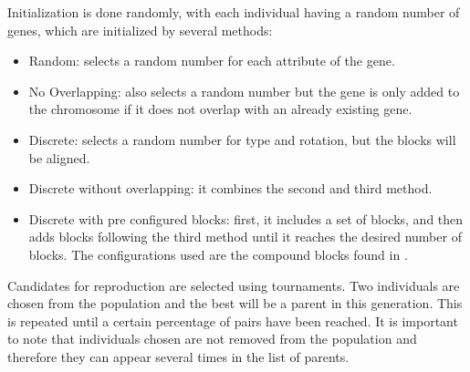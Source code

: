 \documentclass[runningheads,a4paper]{llncs}
\begin{document}

Initialization is done randomly, with each individual having a random number of 
genes, which are initialized by several methods: 

\begin{itemize}
	\item Random: selects a random number for each attribute of the gene.
	\item No Overlapping: also selects a random number but the gene is only 
	added to the chromosome if it does not overlap with an already existing 
	gene.
	\item Discrete: selects a random number for type and rotation, but the 
	blocks will be aligned.
	\item Discrete without overlapping: it combines the second and third method.
	\item Discrete with pre configured blocks: first, it includes
	a set of blocks, and then adds blocks following the third method until
	it reaches the desired number of blocks. The configurations used are the
	compound blocks found in \cite{ferreira2014search}.
\end{itemize}

Candidates for reproduction are selected using tournaments. Two individuals are chosen from the 
population and the best will be a parent in this generation. This is 
repeated until a certain percentage of pairs have been reached. It is important 
to note that individuals chosen are not removed from the population and 
therefore they can appear several times in the list of parents. 
\end{document}
